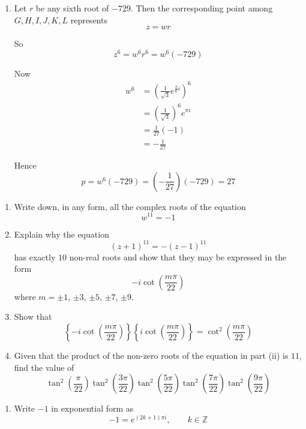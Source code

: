 \documentclass[leqno]{article}
\begin{document}
\begin{enumerate}[
  label=\textbf{\arabic*.},
  leftmargin=*,
  topsep=0pt,
  partopsep=0pt,
  parsep=0pt
]
\begin{djsSolution}
\begin{enumerate}[label=\textbf{(\alph*)}]
  \item Let \(r\) be any sixth root of \(-729\). Then the corresponding point among \(G,H,I,J,K,L\) represents
\[
z=wr
\]

So
\[
z^6=w^6r^6=w^6(-729)
\]

Now
\begin{align*}
w^6&=\left(\frac{1}{\sqrt3}e^{\frac{\pi}{6}i}\right)^6\\
&=\left(\frac{1}{\sqrt3}\right)^6 e^{\pi i}\\
&=\frac{1}{27}(-1)\\
&=-\frac{1}{27}
\end{align*}

Hence
\[
p=w^6(-729)=\left(-\frac{1}{27}\right)(-729)=27
\]
\end{enumerate}
\end{djsSolution}


\newpage

\questionitem

\begin{enumerate}[label=\textbf{(\roman*)}]
  \item Write down, in any form, all the complex roots of the equation
  \[
  w^{11}=-1
  \]
  \item Explain why the equation
  \[
  (z+1)^{11}=-(z-1)^{11}
  \]
  has exactly $10$ non-real roots and show that they may be expressed in the form
  \[
  -i\cot\left(\frac{m\pi}{22}\right)
  \]
  where $m=\pm 1$, $\pm 3$, $\pm 5$, $\pm 7$, $\pm 9$. 
  \item Show that
  \[
  \left\{-i\cot\left(\frac{m\pi}{22}\right)\right\}\left\{i\cot\left(\frac{m\pi}{22}\right)\right\}=\cot^2\left(\frac{m\pi}{22}\right)
  \]
  \item Given that the product of the non-zero roots of the equation in part (ii) is $11$, find the value of
  \[
  \tan^2\left(\frac{\pi}{22}\right)\tan^2\left(\frac{3\pi}{22}\right)\tan^2\left(\frac{5\pi}{22}\right)\tan^2\left(\frac{7\pi}{22}\right)\tan^2\left(\frac{9\pi}{22}\right)
  \]
\end{enumerate}

\vspace*{10pt}

\begin{djsSolution}
\begin{enumerate}[label=\textbf{(\roman*)}]
\item Write $-1$ in exponential form as
\[
-1=e^{(2k+1)\pi i},
\qquad k\in\mathbb{Z}
\]


\end{enumerate}
\end{djsSolution}
\end{enumerate}
\end{document}
